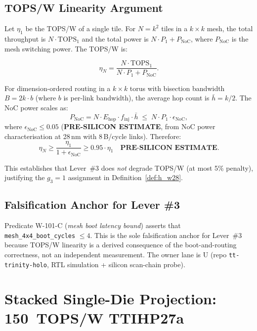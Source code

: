 \subsection{TOPS/W Linearity Argument}

Let \(\eta_{1}\) be the TOPS/W of a single tile.  For \(N = k^{2}\) tiles in
a \(k\times k\) mesh, the total throughput is \(N \cdot \text{TOPS}_{1}\) and
the total power is \(N \cdot P_{1} + P_{\mathrm{NoC}}\), where
\(P_{\mathrm{NoC}}\) is the mesh switching power.  The TOPS/W is:

\[
  \eta_{N} = \frac{N \cdot \text{TOPS}_{1}}{N \cdot P_{1} + P_{\mathrm{NoC}}}.
\]

For dimension-ordered routing in a \(k\times k\) torus with bisection bandwidth
\(B = 2k \cdot b\) (where \(b\) is per-link bandwidth), the average hop count
is \(\bar{h} = k/2\).  The NoC power scales as:
\[
  P_{\mathrm{NoC}} = N \cdot E_{\mathrm{hop}} \cdot f_{\mathrm{inj}} \cdot \bar{h}
  \;\leq\; N \cdot P_{1} \cdot \epsilon_{\mathrm{NoC}},
\]
where \(\epsilon_{\mathrm{NoC}} \leq 0.05\) (\textbf{PRE-SILICON ESTIMATE},
from NoC power characterisation at 28\,nm with 8\,B/cycle links).  Therefore:
\[
  \eta_{N} \geq \frac{\eta_{1}}{1 + \epsilon_{\mathrm{NoC}}} \geq 0.95 \cdot \eta_{1}
  \quad \textbf{PRE-SILICON ESTIMATE}.
\]

This establishes that Lever~\#3 does \emph{not} degrade TOPS/W (at most 5\%
penalty), justifying the \(g_{3} = 1\) assignment in Definition~\ref{def:h_w28}.

\subsection{Falsification Anchor for Lever \#3}

Predicate W-101-C (\emph{mesh boot latency bound}) asserts that
\texttt{mesh\_4x4\_boot\_cycles} \(\leq 4\).  This is the sole falsification
anchor for Lever~\#3 because TOPS/W linearity is a derived consequence of
the boot-and-routing correctness, not an independent measurement.  The
owner lane is U (repo \texttt{tt-trinity-holo}, RTL simulation +
silicon scan-chain probe).

\section{Stacked Single-Die Projection: 150~TOPS/W TTIHP27a}
\label{sec:stacked_projection}


